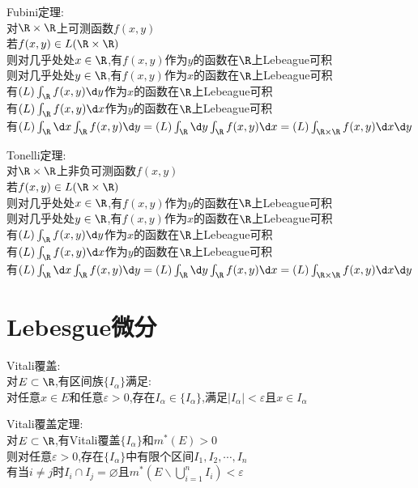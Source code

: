 \begin{dingli}
Fubini定理:\\
对$\R\times\R$上可测函数$f(x,y)$\\
若$f(x,y)\in L(\R\times\R)$\\
则对几乎处处$x\in\R$,有$f(x,y)$作为$y$的函数在$\R$上Lebeague可积\\
则对几乎处处$y\in\R$,有$f(x,y)$作为$x$的函数在$\R$上Lebeague可积\\
有$(L)\int_{\R}f(x,y)\d y$作为$x$的函数在$\R$上Lebeague可积\\
有$(L)\int_{\R}f(x,y)\d x$作为$y$的函数在$\R$上Lebeague可积\\
有$(L)\int_{\R}\d x\int_{\R}f(x,y)\d y=(L)\int_{\R}\d y\int_{\R}f(x,y)\d x=(L)\int_{\R\times\R}f(x,y)\d x\d y$
\end{dingli}

\begin{dingli}
Tonelli定理:\\
对$\R\times\R$上非负可测函数$f(x,y)$\\
若$f(x,y)\in L(\R\times\R)$\\
则对几乎处处$x\in\R$,有$f(x,y)$作为$y$的函数在$\R$上Lebeague可积\\
则对几乎处处$y\in\R$,有$f(x,y)$作为$x$的函数在$\R$上Lebeague可积\\
有$(L)\int_{\R}f(x,y)\d y$作为$x$的函数在$\R$上Lebeague可积\\
有$(L)\int_{\R}f(x,y)\d x$作为$y$的函数在$\R$上Lebeague可积\\
有$(L)\int_{\R}\d x\int_{\R}f(x,y)\d y=(L)\int_{\R}\d y\int_{\R}f(x,y)\d x=(L)\int_{\R\times\R}f(x,y)\d x\d y$
\end{dingli}

\chapter{Lebesgue微分}

\begin{dingyi}
Vitali覆盖:\\
对$E\subset\R$,有区间族$\{I_{\alpha}\}$满足:\\
对任意$x\in E$和任意$\varepsilon>0$,存在$I_{\alpha}\in \{I_{\alpha}\}$,满足$|I_{\alpha}|<\varepsilon$且$x\in I_{\alpha}$
\end{dingyi}

\begin{dingli}
Vitali覆盖定理:\\
对$E\subset\R$,有Vitali覆盖$\{I_{\alpha}\}$和$m^*(E)>0$\\
则对任意$\varepsilon>0$,存在$\{I_{\alpha}\}$中有限个区间$I_1,I_2,\cdots,I_n$\\
有当$i\neq j$时$I_i\cap I_j=\varnothing$且$m^*(E\backslash \bigcup\limits_{i=1}^{n}I_i)<\varepsilon$
\end{dingli}

